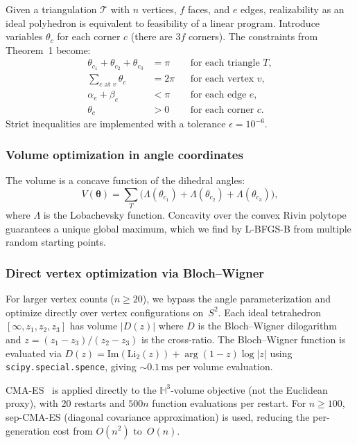 \documentclass[11pt]{article}
\begin{document}
Given a triangulation $\mathcal{T}$ with $n$ vertices, $f$ faces,
and $e$ edges, realizability as an ideal polyhedron is equivalent
to feasibility of a linear program.  Introduce variables $\theta_c$
for each corner $c$ (there are $3f$ corners).  The constraints from
Theorem~1 become:
\begin{align*}
\theta_{c_1} + \theta_{c_2} + \theta_{c_3} &= \pi
  && \text{for each triangle } T, \\
\sum_{c \text{ at } v} \theta_c &= 2\pi
  && \text{for each vertex } v, \\
\alpha_e + \beta_e &< \pi
  && \text{for each edge } e, \\
\theta_c &> 0
  && \text{for each corner } c.
\end{align*}
Strict inequalities are implemented with a tolerance
$\epsilon = 10^{-6}$.

\subsubsection{Volume optimization in angle coordinates}

The volume is a concave function of the dihedral angles:
\[
V(\boldsymbol{\theta})
= \sum_T \bigl(\Lambda(\theta_{c_1})
  + \Lambda(\theta_{c_2})
  + \Lambda(\theta_{c_3})\bigr),
\]
where $\Lambda$ is the Lobachevsky function.  Concavity over the
convex Rivin polytope guarantees a unique global maximum, which we
find by L-BFGS-B from multiple random starting points.

\subsubsection{Direct vertex optimization via Bloch--Wigner}

For larger vertex counts ($n \geq 20$), we bypass the angle
parameterization and optimize directly over vertex configurations
on~$S^2$.  Each ideal tetrahedron $[\infty, z_1, z_2, z_3]$ has
volume $|D(z)|$ where $D$ is the Bloch--Wigner dilogarithm and
$z = (z_1 - z_3)/(z_2 - z_3)$ is the cross-ratio.  The
Bloch--Wigner function is evaluated via
$D(z) = \mathrm{Im}(\mathrm{Li}_2(z)) + \arg(1-z)\log|z|$
using \texttt{scipy.special.spence}, giving $\sim 0.1\,\text{ms}$
per volume evaluation.

CMA-ES~\cite{HansenOstermeier2001} is applied directly to the
$\mathbb{H}^3$-volume objective (not the Euclidean proxy), with
20 restarts and $500n$ function evaluations per restart.  For
$n \geq 100$, sep-CMA-ES (diagonal covariance approximation) is
used, reducing the per-generation cost from $O(n^2)$ to~$O(n)$.
\end{document}
